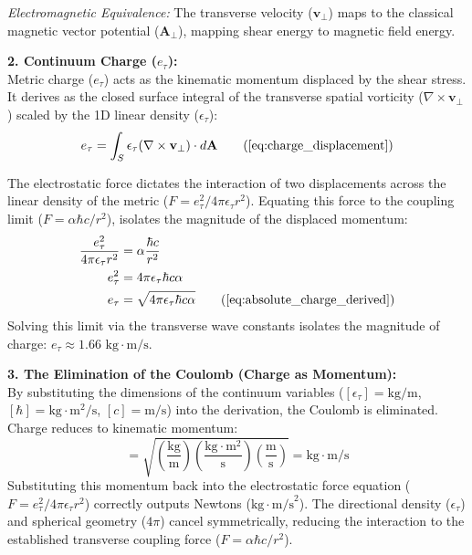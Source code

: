 \textit{Electromagnetic Equivalence:} The transverse velocity ($\mathbf{v}_\perp$) maps to the classical magnetic vector potential ($\mathbf{A}_\perp$), mapping shear energy to magnetic field energy.

\vspace{0.2 cm}

\textbf{2. Continuum Charge ($e_{\tau}$):} \\
Metric charge ($e_{\tau}$) acts as the kinematic momentum displaced by the shear stress. It derives as the closed surface integral of the transverse spatial vorticity ($\nabla \times \mathbf{v}_{\perp}$) scaled by the 1D linear density ($\epsilon_{\tau}$):
\begin{equation}
    e_{\tau} = \int_S \epsilon_{\tau} (\nabla \times \mathbf{v}_{\perp}) \cdot d\mathbf{A} \tag{\ref{eq:charge_displacement}}
\end{equation}

The electrostatic force dictates the interaction of two displacements across the linear density of the metric ($F = e_{\tau}^2 / 4\pi \epsilon_{\tau} r^2$). Equating this force to the coupling limit ($F = \alpha \hbar c / r^2$), isolates the magnitude of the displaced momentum:
\begin{align}
    \frac{e_{\tau}^2}{4\pi \epsilon_{\tau} r^2} &= \alpha \frac{\hbar c}{r^2} \nonumber \\
    e_{\tau}^2 &= 4\pi \epsilon_{\tau} \hbar c \alpha \nonumber \\
    e_{\tau} &= \sqrt{4\pi \epsilon_{\tau} \hbar c \alpha} \tag{\ref{eq:absolute_charge_derived}}
\end{align}
Solving this limit via the transverse wave constants isolates the magnitude of charge: $e_{\tau} \approx 1.66 \text{ kg}\cdot\text{m/s}$.

\vspace{0.2 cm}

\textbf{3. The Elimination of the Coulomb (Charge as Momentum):} \\
By substituting the dimensions of the continuum variables ($[\epsilon_{\tau}] = \text{kg/m}$, $[\hbar] = \text{kg}\cdot\text{m}^2/\text{s}$, $[c] = \text{m/s}$) into the derivation, the Coulomb is eliminated. Charge reduces to kinematic momentum:
\begin{equation}
    [e_{\tau}] = \sqrt{ \left(\frac{\text{kg}}{\text{m}}\right) \left(\frac{\text{kg}\cdot\text{m}^2}{\text{s}}\right) \left(\frac{\text{m}}{\text{s}}\right) } = \text{kg}\cdot\text{m/s} \label{eq:charge_dimension}
\end{equation}
Substituting this momentum back into the electrostatic force equation ($F = e_{\tau}^2 / 4\pi \epsilon_{\tau} r^2$) correctly outputs Newtons ($\text{kg}\cdot\text{m/s}^2$). The directional density ($\epsilon_{\tau}$) and spherical geometry ($4\pi$) cancel symmetrically, reducing the interaction to the established transverse coupling force ($F = \alpha \hbar c / r^2$).

